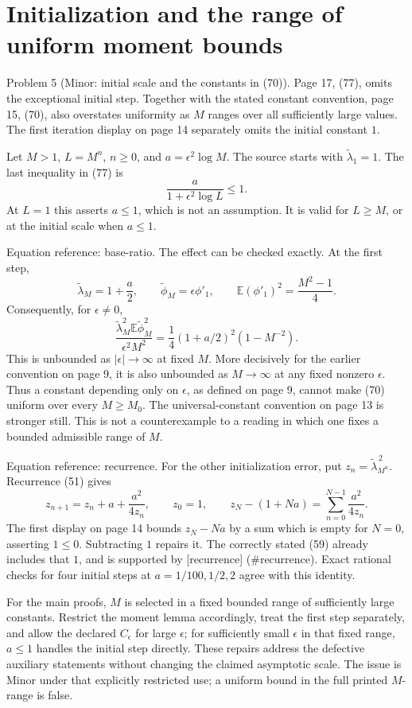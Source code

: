 \documentclass[10pt]{article}
\begin{document}
\section*{Initialization and the range of uniform moment bounds}
Problem 5 (Minor: initial scale and the constants in (70)).  Page 17, (77), omits the exceptional initial step. Together with the stated constant convention, page 15, (70), also overstates uniformity as \(M\) ranges over all sufficiently large values. The first iteration display on page 14 separately omits the initial constant \(1\).\par
Let \(M>1\), \(L=M^n\), \(n\geq0\), and \(a=\epsilon^2\log M\). The source starts with \(\widetilde\lambda_1=1\). The last inequality in (77) is \[\frac{a}{1+\epsilon^2\log L}\leq1.\] At \(L=1\) this asserts \(a\leq1\), which is not an assumption. It is valid for \(L\geq M\), or at the initial scale when \(a\leq1\).\par
Equation reference: base-ratio. The effect can be checked exactly. At the first step, \[\widetilde\lambda_M=1+\frac a2,\qquad
 \widetilde\phi_M=\epsilon\phi'_1,\qquad
 \mathbb E(\phi'_1)^2=\frac{M^2-1}{4}.\] Consequently, for \(\epsilon\ne0\), \[
 \frac{\widetilde\lambda_M^2\mathbb E\widetilde\phi_M^2}
      {\epsilon^2 M^2}
   =\frac14(1+a/2)^2(1-M^{-2}).\] This is unbounded as \(|\epsilon|\to\infty\) at fixed \(M\). More decisively for the earlier convention on page 9, it is also unbounded as \(M\to\infty\) at any fixed nonzero \(\epsilon\). Thus a constant depending only on \(\epsilon\), as defined on page 9, cannot make (70) uniform over every \(M\geq M_0\). The universal-constant convention on page 13 is stronger still. This is not a counterexample to a reading in which one fixes a bounded admissible range of \(M\).\par
Equation reference: recurrence. For the other initialization error, put \(z_n=\widetilde\lambda_{M^n}^{\,2}\). Recurrence (51) gives \[
 z_{n+1}=z_n+a+\frac{a^2}{4z_n},\qquad
 z_0=1,\qquad
 z_N-(1+Na)=\sum_{n=0}^{N-1}\frac{a^2}{4z_n}.\] The first display on page 14 bounds \(z_N-Na\) by a sum which is empty for \(N=0\), asserting \(1\leq0\). Subtracting \(1\) repairs it. The correctly stated (59) already includes that \(1\), and is supported by [recurrence] (\#recurrence). Exact rational checks for four initial steps at \(a=1/100,1/2,2\) agree with this identity.\par
For the main proofs, \(M\) is selected in a fixed bounded range of sufficiently large constants. Restrict the moment lemma accordingly, treat the first step separately, and allow the declared \(C_\epsilon\) for large \(\epsilon\); for sufficiently small \(\epsilon\) in that fixed range, \(a\leq1\) handles the initial step directly. These repairs address the defective auxiliary statements without changing the claimed asymptotic scale. The issue is Minor under that explicitly restricted use; a uniform bound in the full printed \(M\)-range is false.\par
\end{document}
